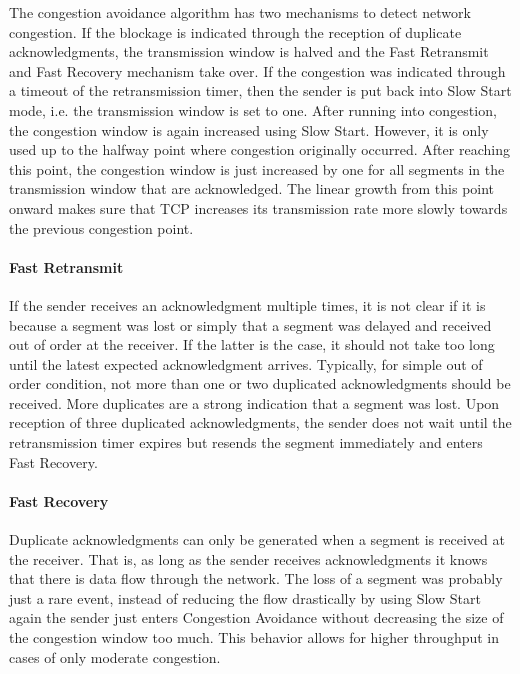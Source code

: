 The congestion avoidance algorithm has two mechanisms to detect network congestion. If the blockage is indicated through the reception of duplicate acknowledgments, the transmission window is halved and the Fast Retransmit and Fast Recovery mechanism take over. If the congestion was indicated through a timeout of the retransmission timer, then the sender is put back into Slow Start mode, i.e. the transmission window is set to one. After running into congestion, the congestion window is again increased using Slow Start. However, it is only used up to the halfway point where congestion originally occurred. After reaching this point, the congestion window is just increased by one for all segments in the transmission window that are acknowledged. The linear growth from this point onward makes sure that TCP increases its transmission rate more slowly towards the previous congestion point.  

\paragraph{Fast Retransmit}

If the sender receives an acknowledgment multiple times, it is not clear if it is because a segment was lost or simply that a segment was delayed and received out of order at the receiver. If the latter is the case, it should not take too long until the latest expected acknowledgment arrives. Typically, for simple out of order condition, not more than one or two duplicated acknowledgments should be received. More duplicates are a strong indication that a segment was lost. Upon reception of three duplicated acknowledgments, the sender does not wait until the retransmission timer expires but resends the segment immediately and enters Fast Recovery.

\paragraph{Fast Recovery}

Duplicate acknowledgments can only be generated when a segment is received at the receiver. That is, as long as the sender receives acknowledgments it knows that there is data flow through the network. The loss of a segment was probably just a rare event, instead of reducing the flow drastically by using Slow Start again the sender just enters Congestion Avoidance without decreasing the size of the congestion window too much. This behavior allows for higher throughput in cases of only moderate congestion.

